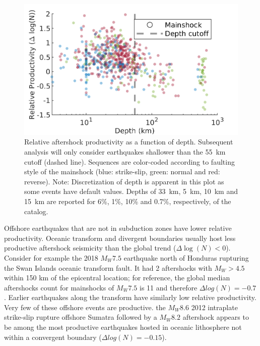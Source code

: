 \documentclass[draft, jgrga]{agujournal2018}
\begin{document}
    \begin{figure}
        \centering
        \includegraphics{figures/prod_vs_depth.png}
        \caption{Relative aftershock productivity as a function of depth. Subsequent analysis will only consider earthquakes shallower than the 55~km cutoff (dashed line). Sequences are color-coded according to faulting style of the mainshock (blue: strike-slip, green: normal and red: reverse). Note: Discretization of depth is apparent in this plot as some events have default values. Depths of  33~km, 5~km, 10~km and 15~km are reported for  6\%, 1\%, 10\% and 0.7\%, respectively, of the catalog.
        }
        \label{fig:prod_vs_depth}
    \end{figure}
    
    Offshore earthquakes that are not in subduction zones have lower relative productivity. Oceanic transform and divergent boundaries usually host less productive aftershock seismicity than the global trend ($\Delta \log(N)<0$). Consider for example the 2018 $M_W7.5$ earthquake north of Honduras rupturing the Swan Islands oceanic transform fault. It had 2 aftershocks with $M_W>4.5$ within 150 km of the epicentral location; for reference, the global median aftershocks count for mainshocks of $M_W7.5$ is 11 and therefore $\Delta log(N) = -0.7$. Earlier earthquakes along the transform have similarly low relative productivity. Very few of these offshore events are productive.  the $M_W8.6$ 2012 intraplate strike-slip rupture offshore Sumatra followed by a $M_W8.2$ aftershock appears to be among the most productive earthquakes hosted in oceanic lithosphere not within a convergent boundary ($\Delta log(N) = -0.15$).
    
\end{document}
